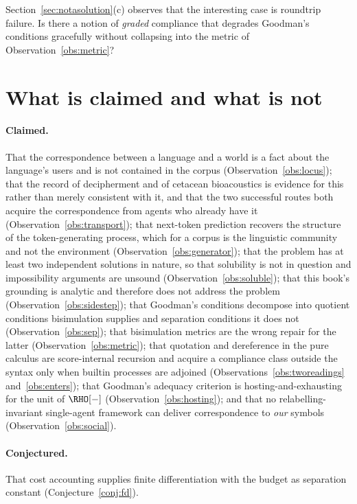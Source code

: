 \begin{question}
\label{q:approx}
Section~\ref{sec:notasolution}(c) observes that the interesting
case is roundtrip failure.
Is there a notion of \emph{graded} compliance that degrades
Goodman's conditions gracefully without collapsing into the metric
of Observation~\ref{obs:metric}?
\end{question}

\section{What is claimed and what is not}
\label{sec:notation-claims}

\paragraph{Claimed.}
That the correspondence between a language and a world is a fact
about the language's users and is not contained in the corpus
(Observation~\ref{obs:locus}); that the record of decipherment and
of cetacean bioacoustics is evidence for this rather than merely
consistent with it, and that the two successful routes both acquire
the correspondence from agents who already have it
(Observation~\ref{obs:transport}); that next-token prediction
recovers the structure of the token-generating process, which for a
corpus is the linguistic community and not the environment
(Observation~\ref{obs:generator}); that the problem has at least
two independent solutions in nature, so that solubility is not in
question and impossibility arguments are unsound
(Observation~\ref{obs:soluble}); that this book's grounding is
analytic and therefore does not address the problem
(Observation~\ref{obs:sidestep}); that Goodman's conditions
decompose into quotient conditions bisimulation supplies and
separation conditions it does not (Observation~\ref{obs:sep}); that
bisimulation metrics are the wrong repair for the latter
(Observation~\ref{obs:metric}); that quotation and dereference in
the pure calculus are score-internal recursion and acquire a
compliance class outside the syntax only when builtin processes are
adjoined (Observations~\ref{obs:tworeadings}
and~\ref{obs:enters}); that Goodman's adequacy criterion is
hosting-and-exhausting for the unit of $\RHO[-]$
(Observation~\ref{obs:hosting}); and that no relabelling-invariant
single-agent framework can deliver correspondence to \emph{our}
symbols (Observation~\ref{obs:social}).

\paragraph{Conjectured.}
That cost accounting supplies finite differentiation with the
budget as separation constant (Conjecture~\ref{conj:fd}).

